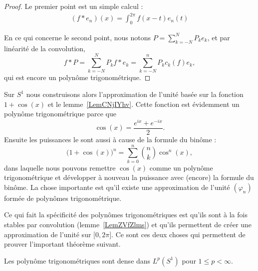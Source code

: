 \begin{proof}
    Le premier point est un simple calcul :
    \begin{subequations}
        \begin{align}
            (f*e_n)(x)=\int_0^{2\pi}f(x-t)e_n(t)
        \end{align}
    \end{subequations}

    En ce qui concerne le second point, nous notons \( P=\sum_{k=-N}^NP_ke_k\), et par linéarité de la convolution,
    \begin{equation}
        f*P=\sum_{k=-N}^NP_kf*e_k=\sum_{k=-N}^nP_kc_k(f)e_k,
    \end{equation}
    qui est encore un polynôme trigonométrique.
\end{proof}

\begin{example} \label{ExDMnVSWF}
    Sur \( S^1\) nous construisons alors l'approximation de l'unité basée sur la fonction \( 1+\cos(x)\) et le lemme~\ref{LemCNjIYhv}. Cette fonction est évidemment un polynôme trigonométrique parce que
    \begin{equation}
        \cos(x)=\frac{  e^{ix}+ e^{-ix} }{2}.
    \end{equation}
    Ensuite les puissances le sont aussi à cause de la formule du binôme :
    \begin{equation}
        \big( 1+\cos(x) \big)^n=\sum_{k=0}^n\binom{ n }{ k }\cos^n(x),
    \end{equation}
    dans laquelle nous pouvons remettre \( \cos(x)\) comme un polynôme trigonométrique et développer à nouveau la puissance avec (encore) la formule du binôme. La chose importante est qu'il existe une approximation de l'unité \( (\varphi_n)\) formée de polynômes trigonométrique.

    Ce qui fait la spécificité des polynômes trigonométriques est qu'ils sont à la fois stables par convolution (lemme~\ref{LemZVfZlms}) et qu'ils permettent de créer une approximation de l'unité sur \( \mathopen[ 0 , 2\pi \mathclose]\). Ce sont ces deux choses qui permettent de prouver l'important théorème suivant.
\end{example}

\begin{theorem} \label{ThoQGPSSJq}
    Les polynôme trigonométriques sont dense dans \( L^p(S^1)\) pour \( 1\leq p<\infty\).
\end{theorem}

